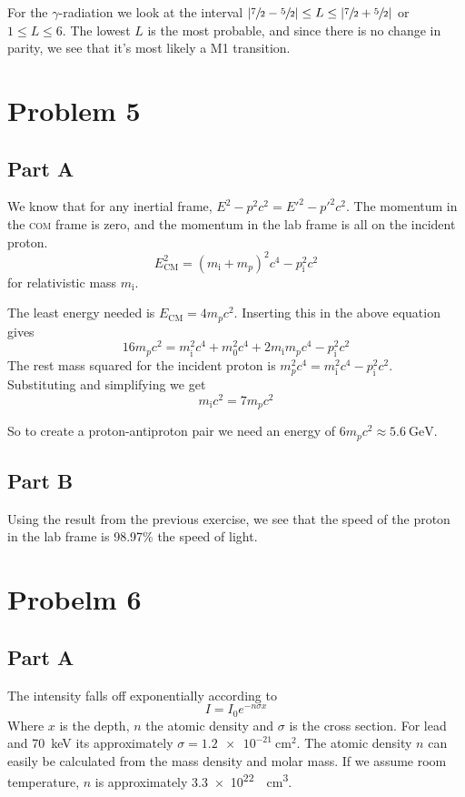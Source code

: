 \documentclass[a4paper, parskip=half, twopage]{scrartcl}
\begin{document}
For the $\gamma$-radiation we look at the interval $|\sfrac 7 2 - \sfrac 5 2 | \leq L \leq | \sfrac 7 2 + \sfrac 5 2 |$ or $1 \leq L \leq 6$. The lowest $L$ is the most probable, and since there is no change in parity, we see that it's most likely a M1 transition.

\section*{Problem 5}

\subsection*{Part A}
We know that for any inertial frame, $E^2 - p^2 c^2 = E'^2 - p'^2 c^2$. The momentum in the \textsc{com} frame is zero, and the momentum in the lab frame is all on the incident proton.
\[
E_{\mathrm{CM}}^2 = (m_\mathrm{i} + m_p)^2 c^4 - p_\mathrm{i}^2 c^2
\]
for relativistic mass $m_\mathrm{i}$.

The least energy needed is $E_\mathrm{CM} = 4 m_p c^2$. Inserting this in the above equation gives
\[
16 m_p c^2 = m_\mathrm{i}^2 c^4 + m_0^2 c^4 + 2 m_\mathrm{i} m_p c^4 - p_\mathrm{i}^2 c^2
\]
The rest mass squared for the incident proton is $m_p^2 c^4 = m_\mathrm{i}^2 c^4 - p_\mathrm{i}^2 c^2$. Substituting and simplifying we get
\[
m_\mathrm{i} c^2 = 7 m_p c^2
\]

So to create a proton-antiproton pair we need an energy of $6m_p c^2 \approx \SI{5.6}{\GeV}$.

\subsection*{Part B}
Using the result from the previous exercise, we see that the speed of the proton in the lab frame is 98.97\% the speed of light.

\section*{Probelm 6}

\subsection*{Part A}

The intensity falls off exponentially according to
\[
I = I_0 e^{-n \sigma x}
\]
Where $x$ is the depth, $n$ the atomic density and $\sigma$ is the cross section. For lead and \SI{70}{\keV} its approximately $\sigma = \SI{1.2e-21}{\cm^2}$. The atomic density $n$ can easily be calculated from the mass density and molar mass. If we assume room temperature, $n$ is approximately \SI{3.3e22}{\per\cubic\centi\metre}.
\end{document}

